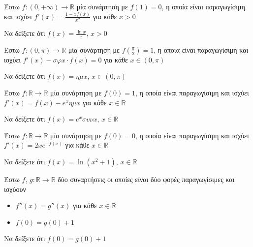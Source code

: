 \documentclass{presentation}
\begin{document}
\begin{askisi}
    Έστω $f:(0,+\infty)\to\mathbb{R}$ μία συνάρτηση με $f(1)=0$, η οποία είναι παραγωγίσιμη και ισχύει $f'(x)=\frac{1-xf(x)}{x^2}$ για κάθε $x>0$

    Να δείξετε ότι $f(x)=\frac{\ln x}{x}$, $x>0$

\end{askisi}

\begin{askisi}
    Έστω $f:(0,π)\to\mathbb{R}$ μία συνάρτηση με $f(\frac{π}{2})=1$, η οποία είναι παραγωγίσιμη και ισχύει $f'(x)-σφx\cdot f(x)=0$ για κάθε $x\in (0,π)$

    Να δείξετε ότι $f(x)=ημx$, $x\in (0,π)$

\end{askisi}

\begin{askisi}
    Έστω $f:\mathbb{R}\to\mathbb{R}$ μία συνάρτηση με $f(0)=1$, η οποία είναι παραγωγίσιμη και ισχύει $f'(x)=f(x)-e^xημx$ για κάθε $x\in\mathbb{R}$

    Να δείξετε ότι $f(x)=e^xσυνx$, $x\in\mathbb{R}$

\end{askisi}

\begin{askisi}
    Έστω $f:\mathbb{R}\to\mathbb{R}$ μία συνάρτηση με $f(0)=0$, η οποία είναι παραγωγίσιμη και ισχύει $f'(x)=2xe^{-f(x)}$ για κάθε $x\in\mathbb{R}$

    Να δείξετε ότι $f(x)=\ln (x^2+1)$, $x\in\mathbb{R}$

\end{askisi}

\begin{askisi}
    Έστω $f$, $g:\mathbb{R}\to\mathbb{R}$ δύο συναρτήσεις οι οποίες είναι δύο φορές παραγωγίσιμες και ισχύουν
    \begin{itemize}
        \item $f''(x)=g''(x)$ για κάθε $x\in\mathbb{R}$
        \item $f(0)=g(0)+1$
    \end{itemize}

    Να δείξετε ότι $f(0)=g(0)+1$

\end{askisi}
\end{document}
